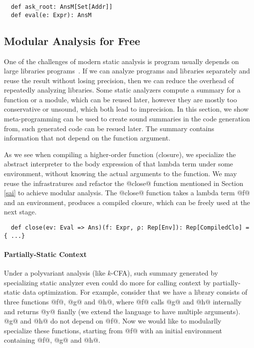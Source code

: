 \begin{lstlisting}
  def ask_root: AnsM[Set[Addr]]
  def eval(e: Expr): AnsM
\end{lstlisting}


\subsection{Modular Analysis for Free} \label{modular}


One of the challenges of modern static analysis is program usually depends on
large libraries programs~\cite{toman_et_al:LIPIcs:2017:7121}. If we can analyze
programs and libraries separately and reuse the result without losing precision,
then we can reduce the overhead of repeatedly analyzing libraries.
Some static analyzers compute a summary for a function or a module, which
can be reused later, however they are mostly too conservative or unsound, which
both lead to imprecision. In this section, we show meta-programming can be used
to create sound summaries in the code generation from, such generated code can
be resued later. The summary contains information that not depend on the
function argument.

As we see when compiling a higher-order function (closure), we specialize the
abstract interpreter to the body expression of that lambda term under some
environment, without knowing the actual arguments to the function. We may reuse
the infrastratures and refactor the @close@ function mentioned in Section
\ref{sai} to achieve modular analysis. The @close@ function takes a lambda term
@f@ and an environment, produces a compiled closure, which can be freely used at
the next stage.

\begin{lstlisting}
  def close(ev: Eval => Ans)(f: Expr, ρ: Rep[Env]): Rep[CompiledClo] = { ...}
\end{lstlisting}

\paragraph{Partially-Static Context} Under a polyvariant analysis (like
$k$-CFA), such summary generated by specializing static analyzer even could do
more for calling context by partially-static data optimization. For example,
consider that we have a library consists of three functions @f@, @g@ and @h@,
where @f@ calls @g@ and @h@ internally and returns @y@ fianlly (we extend the
language to have multiple arguments). @g@ and @h@ do not depend on @f@. Now we
would like to modularlly specialize these functions, starting from @f@ with an
initial environment containing @f@, @g@ and @h@.

